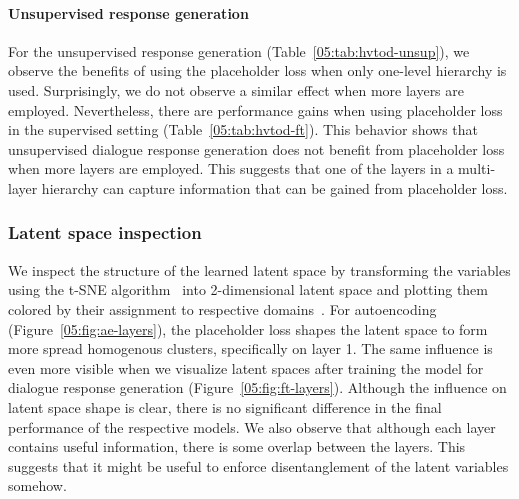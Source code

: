 \paragraph{Unsupervised response generation}
For the unsupervised response generation (Table~\ref{05:tab:hvtod-unsup}), we observe the benefits of using the placeholder loss when only one-level hierarchy is used.
Surprisingly, we do not observe a similar effect when more layers are employed.
Nevertheless, there are performance gains when using placeholder loss in the supervised setting (Table~\ref{05:tab:hvtod-ft}).
This behavior shows that unsupervised dialogue response generation does not benefit from placeholder loss when more layers are employed.
This suggests that one of the layers in a multi-layer hierarchy can capture information that can be gained from placeholder loss.

\subsubsection{Latent space inspection}
We inspect the structure of the learned latent space by transforming the variables using the t-SNE algorithm~\cite{van2008visualizing} into 2-dimensional latent space and plotting them colored by their assignment to respective domains~\cite{lubis-etal-2022-dialogue}.
For autoencoding (Figure~\ref{05:fig:ae-layers}), the placeholder loss shapes the latent space to form more spread homogenous clusters, specifically on layer 1.
The same influence is even more visible when we visualize latent spaces after training the model for dialogue response generation (Figure~\ref{05:fig:ft-layers}).
Although the influence on latent space shape is clear, there is no significant difference in the final performance of the respective models.
We also observe that although each layer contains useful information, there is some overlap between the layers.
This suggests that it might be useful to enforce disentanglement of the latent variables somehow.

